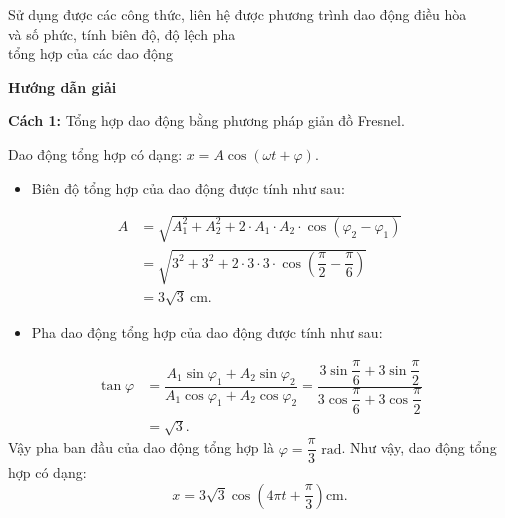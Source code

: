 \begin{dang}{Sử dụng được các công thức, liên hệ được phương trình dao động điều hòa\\ và số phức, tính biên độ, độ lệch pha\\ tổng hợp của các dao động}
{\begin{description}
		\end{description}
	}
	{\begin{center}
			\textbf{Hướng dẫn giải}
		\end{center}
		
		\textbf{Cách 1: }Tổng hợp dao động bằng phương pháp giản đồ Fresnel.
		
		Dao động tổng hợp có dạng: $x=A\cos(\omega t+\varphi)$. 
		\begin{itemize}
			\item Biên độ tổng hợp của dao động được tính như sau:
		\end{itemize}
		\begin{align*}
			A&=\sqrt{A^2_1+A^2_2 + 2\cdot A_1\cdot A_2\cdot \cos(\varphi_2-\varphi_1)}\\
			&=
			\sqrt{3^2+3^2 + 2\cdot 3 \cdot 3\cdot \cos\left(\dfrac{\pi}{2}-\dfrac{\pi}{6}\right)}\\
			&=
			3\sqrt{3}\ \textrm{cm}.
		\end{align*}
		
		\begin{itemize}
			\item Pha dao động tổng hợp của dao động được tính như sau:
		\end{itemize}
		\begin{align*}
			\tan\varphi &=
			\dfrac{A_1\sin\varphi_1+A_2\sin\varphi_2}
			{A_1\cos\varphi_1+A_2\cos\varphi_2}
			=
			\dfrac{3\sin\dfrac{\pi}{6}+3\sin\dfrac{\pi}{2}}
			{3\cos\dfrac{\pi}{6}+3\cos\dfrac{\pi}{2}}\\
			&=
			\sqrt{3}.
		\end{align*}
		Vậy pha ban đầu của dao động tổng hợp là $\varphi=\dfrac{\pi}{3}$ $\textrm{rad}$. Như vậy, dao động tổng hợp có dạng:
		\begin{equation*}
			x=3\sqrt{3}\cos\left(4\pi t+\dfrac{\pi}{3}\right) \textrm{cm}.
		\end{equation*}
		
}
\end{dang}
